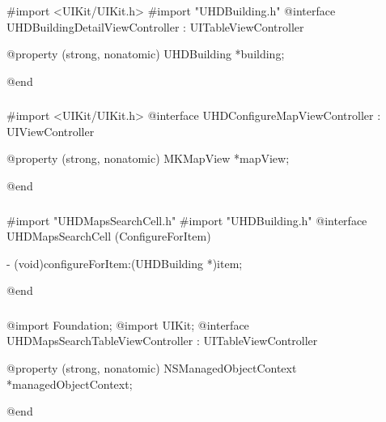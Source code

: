 \documentclass{report}
\begin{document}
\vspace{0,5cm}

\subsubsection{}

\begin{objclst}
#import <UIKit/UIKit.h>
#import "UHDBuilding.h"
@interface UHDBuildingDetailViewController : UITableViewController

@property (strong, nonatomic) UHDBuilding *building;

@end
\end{objclst}

\vspace{0,5cm}

\subsubsection{}

\begin{objclst}
#import <UIKit/UIKit.h>
@interface UHDConfigureMapViewController : UIViewController

@property (strong, nonatomic) MKMapView *mapView;

@end
\end{objclst}

\vspace{0,5cm}

\subsubsection{}

\begin{objclst}
#import "UHDMapsSearchCell.h"
#import "UHDBuilding.h"
@interface UHDMapsSearchCell (ConfigureForItem)

- (void)configureForItem:(UHDBuilding *)item;

@end
\end{objclst}

\vspace{0,5cm}

\subsubsection{}

\begin{objclst}
@import Foundation;
@import UIKit;
@interface UHDMapsSearchTableViewController : UITableViewController

@property (strong, nonatomic) NSManagedObjectContext *managedObjectContext;

@end
\end{objclst}
\end{document}
